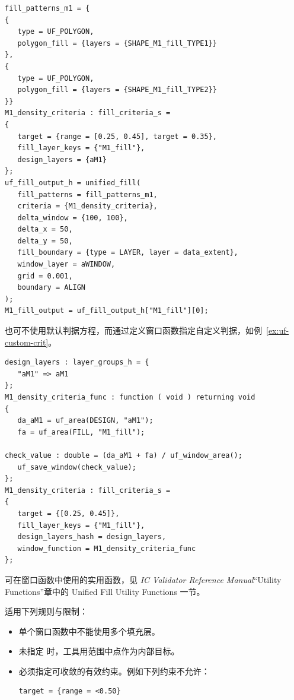 \begin{lstlisting}[style=pxl,caption={图案定义序列},label={ex:uf-seq-pat}]
fill_patterns_m1 = {
{
   type = UF_POLYGON,
   polygon_fill = {layers = {SHAPE_M1_fill_TYPE1}}
},
{
   type = UF_POLYGON,
   polygon_fill = {layers = {SHAPE_M1_fill_TYPE2}}
}}
M1_density_criteria : fill_criteria_s =
{
   target = {range = [0.25, 0.45], target = 0.35},
   fill_layer_keys = {"M1_fill"},
   design_layers = {aM1}
};
uf_fill_output_h = unified_fill(
   fill_patterns = fill_patterns_m1,
   criteria = {M1_density_criteria},
   delta_window = {100, 100},
   delta_x = 50,
   delta_y = 50,
   fill_boundary = {type = LAYER, layer = data_extent},
   window_layer = aWINDOW,
   grid = 0.001,
   boundary = ALIGN
);
M1_fill_output = uf_fill_output_h["M1_fill"][0];
\end{lstlisting}

也可不使用默认判据方程，而通过定义窗口函数指定自定义判据，如例~\ref{ex:uf-custom-crit}。

\begin{lstlisting}[style=pxl,caption={自定义判据方程},label={ex:uf-custom-crit}]
design_layers : layer_groups_h = {
   "aM1" => aM1
};
M1_density_criteria_func : function ( void ) returning void
{
   da_aM1 = uf_area(DESIGN, "aM1");
   fa = uf_area(FILL, "M1_fill");

check_value : double = (da_aM1 + fa) / uf_window_area();
   uf_save_window(check_value);
};
M1_density_criteria : fill_criteria_s =
{
   target = {[0.25, 0.45]},
   fill_layer_keys = {"M1_fill"},
   design_layers_hash = design_layers,
   window_function = M1_density_criteria_func
};
\end{lstlisting}

\begin{seeAlsoBox}
可在窗口函数中使用的实用函数，见 \textit{IC Validator Reference Manual}“Utility Functions”章中的 Unified Fill Utility Functions 一节。
\end{seeAlsoBox}

适用下列规则与限制：
\begin{itemize}
  \item 单个窗口函数中不能使用多个填充层。
  \item 未指定  时，工具用范围中点作为内部目标。
  \item 必须指定可收敛的有效约束。例如下列约束不允许：
  \begin{lstlisting}[style=pxl]
target = {range = <0.50}
  \end{lstlisting}
\end{itemize}

